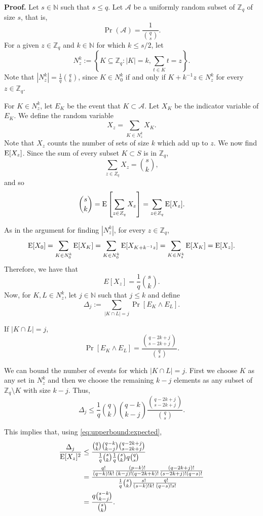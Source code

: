 \textbf{Proof. } Let $s \in \mathbb{N}$ such that $s\leq q$. Let $\mathcal{A}$ be a uniformly random subset of $\mathbb{Z}_q$ of size $s$, that is, 
\[\Pr(\mathcal{A}) = \frac{1}{\binom{q}{s}}.\]
For a given $z \in \mathbb{Z}_q$ and $k \in \mathbb{N}$ for which $k \leq s/2$, let 
\[N_z^k := \left\{K \subseteq \mathbb{Z}_q: |K| = k, \sum_{t \in K} t = z\right\}.\]
Note that $|N_z^k| = \frac{1}{q}{\binom{q}{k}}$, since $K \in N_0^k$ if and only if $K + k^{-1}z \in N_z^k$ for every $z \in \mathbb{Z}_q$.\par
For $K \in N_z^k$, let $E_K$ be the event that $K \subset\mathcal{A}$. Let $X_K$ be the indicator variable of $E_K$.
We define the random variable 
\[X_z = \sum_{K \in N_z^k} X_K.\]
Note that $X_z$ counts the number of sets of size $k$ which add up to $z$. We now find $\mathrm{E}[X_z]$. Since the sum of every subset $K \subset S$ is in $\mathbb{Z}_q$,
\[\sum_{z \in Z_q} X_z = {\binom{s}{k}},\]
and so
\[\binom{s}{k} = \mathrm{E}\left[\sum_{z \in Z_q} X_z\right] =  \sum_{z \in Z_q} \mathrm{E}[X_z].\]\par
As in the argument for finding $|N_z^k|$, for every $z \in \mathbb{Z}_q$, 
\[\mathrm{E}[X_0] = \sum_{K \in N_0^k}\mathrm{E}[X_K] = \sum_{K \in N_0^k} \mathrm{E}[X_{K + k^{-1}z}] = \sum_{K \in N_z^k} \mathrm{E}[X_K] = \mathrm{E}[X_z].\]
Therefore, we have that
\begin{equation}\label{eq:upperbound:expected}
E[X_z] = \frac{1}{q} {\binom{s}{k}}.
\end{equation}
Now, for $K, L \in N_z^k$, let $j \in \mathbb{N}$ such that $j \leq k$ and define
\[\Delta_j := \sum_{|K \cap L| = j} \Pr[E_K \land E_L].\]
\par 
If $|K \cap L| = j$,
\[\Pr[E_K \land E_L] = \frac{\binom{q - 2k + j}{s - 2k + j}}{\binom{q}{s}}.\]
\par
We can bound the number of events for which $|K \cap L| = j$. First we choose $K$ as any set in $N_z^k$ and then we choose the remaining $k- j$ elements as any subset of $\mathbb{Z}_q \setminus K$ with size $k - j$. Thus, 
\[\Delta_j \leq \frac{1}{q}\binom{q}{k}\binom{q - k}{k - j} \frac{\binom{q - 2k + j}{s - 2k + j}}{\binom{q}{s}}.\]
\par This implies that, using \ref{eq:upperbound:expected},
\begin{align*}
    \frac{\Delta_j}{\mathrm{E}[X_z]^2} &\leq \frac{\binom{q}{k} \binom{q - k}{k - j}\binom{q - 2k + j}{s - 2k + j}}{\frac{1}{q} \binom{s}{k}\frac{1}{q} \binom{s}{k}q\binom{q}{s}} \\
    &= \frac{\frac{q!}{(q - k)!k!}\frac{(p - k)!}{(k - j)!(q - 2k + k)!}\frac{(q - 2k + j)!}{(s - 2k + j)!(q - s)!}}{\frac{1}{q}\binom{s}{k}\frac{s!}{(s - k)!k!}\frac{q!}{(q - s)!s!}} \\
    &= \frac{q\binom{s - k}{k - j}}{\binom{s}{k}}.
\end{align*}
